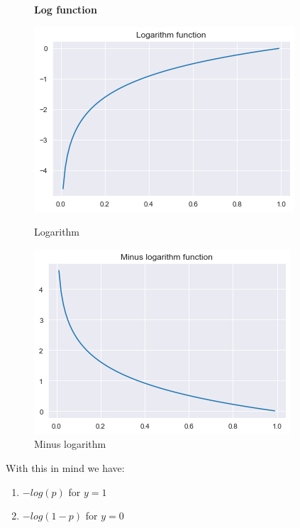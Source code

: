 \documentclass[12pt,a4paper]{article}
\begin{document}
\begin{figure} [H]
    \centering
    \textbf{Log function}\par\medskip
    \begin{minipage}{.5\textwidth}
      \centering
      \includegraphics[width=0.8\linewidth]{logarithm.png}
      \caption{Logarithm}
      \label{fig:Logarithm function on (0, 1)}
    \end{minipage}%
    \begin{minipage}{.5\textwidth}
      \centering
      \includegraphics[width=0.8\linewidth]{minlog.png}
      \caption{Minus logarithm}
      \label{fig:Minus logarithm on (0, 1)}
    \end{minipage}
\end{figure}

With this in mind we have:

\begin{enumerate}
    \item $-log(p)$ for $y=1$
    \item $-log(1-p)$ for $y=0$
\end{enumerate}
\end{document}
